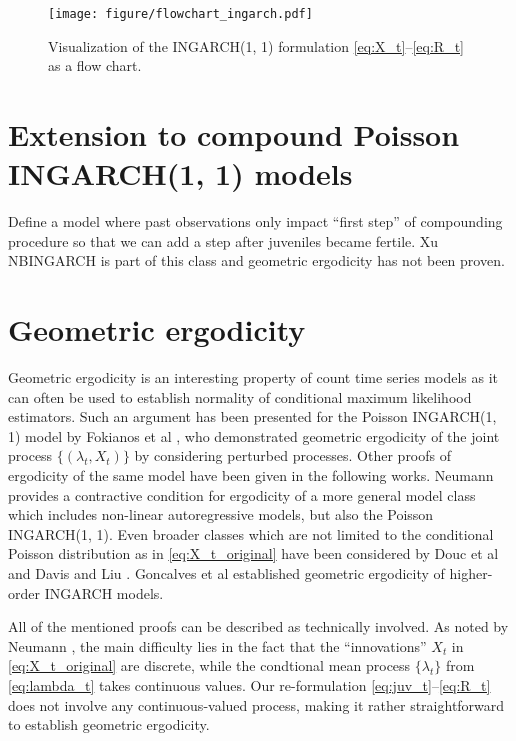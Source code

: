\documentclass[10pt,a4paper]{article}
\begin{document}
\begin{figure}[h!]
\texttt{[image: figure/flowchart\_ingarch.pdf]}
\caption{Visualization of the INGARCH(1, 1) formulation \eqref{eq:X_t}--\eqref{eq:R_t}  as a flow chart.}
\label{fig:ingarch_flowchart}
\end{figure}

\section{Extension to compound Poisson INGARCH(1, 1) models}

Define a model where past observations only impact ``first step'' of compounding procedure so that we can add a step after juveniles became fertile. Xu NBINGARCH is part of this class and geometric ergodicity has not been proven.

\section{Geometric ergodicity}

Geometric ergodicity is an interesting property of count time series models as it can often be used to establish normality of conditional maximum likelihood estimators. Such an argument has been presented for the Poisson INGARCH(1, 1) model by Fokianos et al \cite{Fokianos2009}, who demonstrated geometric ergodicity of the joint process $\{(\lambda_t, X_t)\}$ by considering perturbed processes. Other proofs of ergodicity of the same model have been given in the following works. Neumann \citep{Neumann2011} provides a contractive condition for ergodicity of a more general model class which includes non-linear autoregressive models, but also the Poisson INGARCH(1, 1). Even broader classes which are not limited to the conditional Poisson distribution as in \eqref{eq:X_t_original} have been considered by Douc et al \citep{Douc2013} and Davis and Liu \cite{Davis2016}. Goncalves et al \cite{Goncalves2015} established geometric ergodicity of higher-order INGARCH models.

All of the mentioned proofs can be described as technically involved. As noted by Neumann \cite{Neumann2011}, the main difficulty lies in the fact that the ``innovations'' $X_t$ in \eqref{eq:X_t_original} are discrete, while the condtional mean process $\{\lambda_t\}$ from \eqref{eq:lambda_t} takes continuous values. Our re-formulation \eqref{eq:juv_t}--\eqref{eq:R_t} does not involve any continuous-valued process, making it rather straightforward to establish geometric ergodicity.
\end{document}
